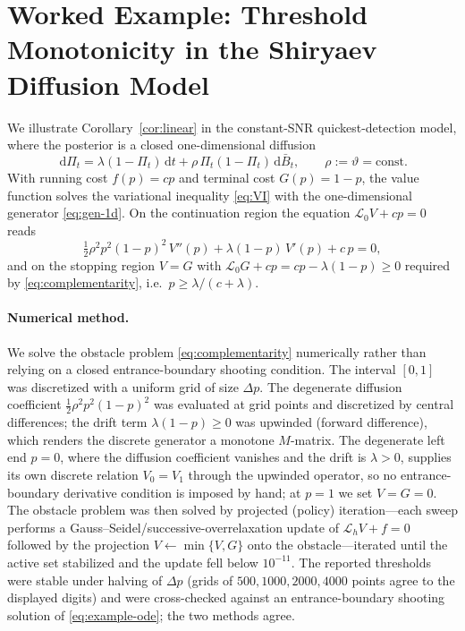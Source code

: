 \documentclass[pdflatex,sn-mathphys-num]{sn-jnl}
\theoremstyle{plain}
\theoremstyle{definition}
\newcommand{\Lgen}{\mathscr{L}}
\newcommand{\dd}{\,\mathrm{d}}
\newcommand{\snr}{\vartheta}
\newcommand{\post}{\Pi}
\newcommand{\bbar}{\bar{B}}
\begin{document}
\section{Worked Example: Threshold Monotonicity in the Shiryaev Diffusion Model}
\label{sec:example}

We illustrate Corollary~\ref{cor:linear} in the constant-SNR quickest-detection
model, where the posterior is a closed one-dimensional diffusion
\begin{equation}\label{eq:shiryaev-diffusion}
  \dd\post_t=\lambda(1-\post_t)\dd t+\rho\,\post_t(1-\post_t)\dd\bbar_t,
  \qquad \rho:=\snr=\text{const}.
\end{equation}
With running cost $f(p)=cp$ and terminal cost $G(p)=1-p$, the value function
solves the variational inequality \eqref{eq:VI} with the one-dimensional generator
\eqref{eq:gen-1d}. On the continuation region the equation $\Lgen_0 V+cp=0$ reads
\begin{equation}\label{eq:example-ode}
  \tfrac12\rho^2 p^2(1-p)^2\,V''(p)+\lambda(1-p)\,V'(p)+c\,p=0,
\end{equation}
and on the stopping region $V=G$ with $\Lgen_0 G+cp=cp-\lambda(1-p)\ge0$ required
by \eqref{eq:complementarity}, i.e.\ $p\ge\lambda/(c+\lambda)$.

\paragraph{Numerical method.}
We solve the obstacle problem \eqref{eq:complementarity} numerically rather than
relying on a closed entrance-boundary shooting condition. The interval $[0,1]$ was
discretized with a uniform grid of size $\Delta p$. The degenerate diffusion
coefficient $\tfrac12\rho^2 p^2(1-p)^2$ was evaluated at grid points and
discretized by central differences; the drift term $\lambda(1-p)\ge0$ was upwinded
(forward difference), which renders the discrete generator a monotone $M$-matrix.
The degenerate left end $p=0$, where the diffusion coefficient vanishes and the
drift is $\lambda>0$, supplies its own discrete relation $V_0=V_1$ through the
upwinded operator, so no entrance-boundary derivative condition is imposed by
hand; at $p=1$ we set $V=G=0$. The obstacle problem was then solved by projected
(policy) iteration---each sweep performs a Gauss--Seidel/successive-overrelaxation
update of $\Lgen_h V+f=0$ followed by the projection $V\leftarrow\min\{V,G\}$
onto the obstacle---iterated until the active set stabilized and the update fell
below $10^{-11}$. The reported thresholds were stable under halving of $\Delta p$
(grids of $500,1000,2000,4000$ points agree to the displayed digits) and were
cross-checked against an entrance-boundary shooting solution of
\eqref{eq:example-ode}; the two methods agree.
\end{document}
